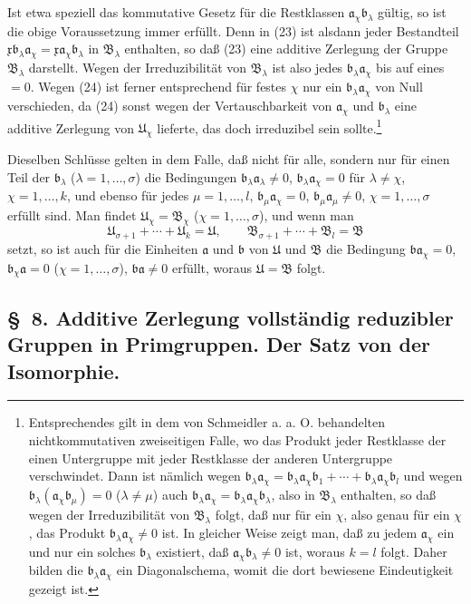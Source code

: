 \documentclass[11pt]{article}
\newcommand{\mB}{\mathfrak{B}}
\newcommand{\ma}{\mathfrak{a}}
\newcommand{\mb}{\mathfrak{b}}
\newcommand{\mx}{\mathfrak{x}}
\newcommand{\mU}{\mathfrak{U}}
\begin{document}
Ist etwa speziell das kommutative Gesetz für die Restklassen $\ma_\chi\mb_\lambda$ gültig, so ist die obige Voraussetzung immer erfüllt. Denn in (23) ist alsdann jeder Bestandteil $\mx\mb_\lambda\ma_\chi=\mx\ma_\chi\mb_\lambda$ in $\mB_\lambda$ enthalten, so daß (23) eine additive Zerlegung der Gruppe $\mB_\lambda$ darstellt. Wegen der Irreduzibilität von $\mB_\lambda$ ist also jedes $\mb_\lambda\ma_\chi$ bis auf eines $=0$. Wegen (24) ist ferner entsprechend für festes $\chi$ nur ein $\mb_\lambda\ma_\chi$ von Null verschieden, da (24) sonst wegen der Vertauschbarkeit von $\ma_\chi$ und $\mb_\lambda$ eine additive Zerlegung von $\mU_\chi$ lieferte, das doch irreduzibel sein sollte.\footnote{Entsprechendes gilt in dem von Schmeidler a. a. O. behandelten nichtkommutativen zweiseitigen Falle, wo das Produkt jeder Restklasse der einen Untergruppe mit jeder Restklasse der anderen Untergruppe verschwindet. Dann ist nämlich wegen $\mb_\lambda\ma_\chi=\mb_\lambda\ma_\chi\mb_1+
\cdots+\mb_\lambda\ma_\chi\mb_l$ und wegen $\mb_\lambda(\ma_\chi\mb_\mu)=0$ ($\lambda\ne\mu$) auch $\mb_\lambda\ma_\chi=\mb_\lambda\ma_\chi\mb_\lambda$, also in $\mB_\lambda$ enthalten, so daß wegen der Irreduzibilität von $\mB_\lambda$ folgt, daß nur für ein $\chi$, also genau für ein $\chi$, das Produkt $\mb_\lambda\ma_\chi\ne0$ ist. In gleicher Weise zeigt man, daß zu jedem $\ma_\chi$ ein und nur ein solches $\mb_\lambda$ existiert, daß $\ma_\chi\mb_\lambda\ne0$ ist, woraus $k=l$ folgt. Daher bilden die $\mb_\lambda\ma_\chi$ ein Diagonalschema, womit die dort bewiesene Eindeutigkeit gezeigt ist.}

Dieselben Schlüsse gelten in dem Falle, daß nicht für alle, sondern nur für einen Teil der $\mb_\lambda$ ($\lambda=1,\ldots,\sigma$) die Bedingungen $\mb_\lambda\ma_\lambda\ne0$, $\mb_\lambda\ma_\chi=0$ für $\lambda\ne\chi$, $\chi=1,\ldots,k$, und ebenso für jedes $\mu=1,\ldots,l$, $\mb_\mu\ma_\chi=0$, $\mb_\mu\ma_\mu\ne0$, $\chi=1,
\ldots,\sigma$ erfüllt sind. Man findet $\mU_\chi=\mB_\chi$ ($\chi=1,
\ldots,\sigma$), und wenn man
\[
 \mU_{\sigma+1}+\cdots+\mU_k=\mU,
 \qquad
 \mB_{\sigma+1}+\cdots+\mB_l=\mB
\]
setzt, so ist auch für die Einheiten $\ma$ und $\mb$ von $\mU$ und $\mB$ die Bedingung $\mb\ma_\chi=0$, $\mb_\chi\ma=0$ ($\chi=1,
\ldots,\sigma$), $\mb\ma\ne0$ erfüllt, woraus $\mU=\mB$ folgt.

\subsection*{\S~8. Additive Zerlegung vollständig reduzibler Gruppen in Primgruppen. Der Satz von der Isomorphie.}
\end{document}
